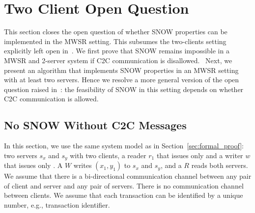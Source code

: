 \section{Two Client Open Question}
\label{sec:2c2s}
{ \color{blue}
This section closes the open question of whether SNOW properties can be implemented in the MWSR setting. This subsumes the two-clients setting explicitly left open in~\cite{SNOW2016}. We first prove that SNOW remains impossible in a 
MWSR and 2-server system if C2C communication is disallowed. 
Next, we present an algorithm that implements SNOW properties in an MWSR setting with at least two servers. Hence we resolve a more general version of the open question raised in~\cite{SNOW2016}: the feasibility of SNOW in this setting depends on whether C2C communication is allowed.
}
 
 \subsection{No  SNOW Without C2C  Messages}
 \label{subsec:no_snow_no_c2c}
 In this section, we use the same system model as in Section~\ref{sec:formal_proof}: two servers $s_x$ and $s_y$ with two clients, a reader $r_1$ that issues only 
\rots{} and a writer $w$ that issues only \wots{}. A \wot{} $W$ writes $(x_1, y_1)$ to $s_x$ and $s_y$, and a \rot{} $R$ reads both servers. We assume that there is a bi-directional communication channel between any pair of client and server and any pair of servers. There is no communication channel between clients. We assume that each transaction can be identified by a unique number, e.g., transaction identifier. 


